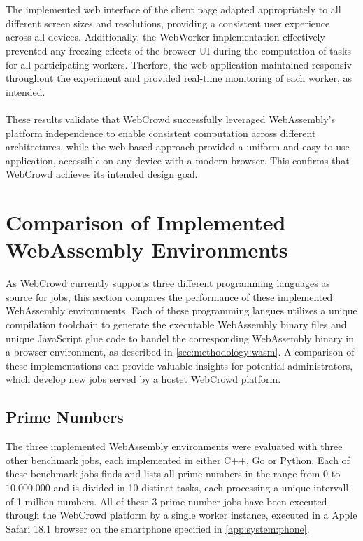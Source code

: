 \\~\\
The implemented web interface of the client page adapted appropriately to all different screen sizes and resolutions, providing a consistent user experience across all devices. Additionally, the WebWorker implementation effectively prevented any freezing effects of the browser \ac{UI} during the computation of tasks for all participating workers. Therfore, the web application maintained responsiv throughout the experiment and provided real-time monitoring of each worker, as intended.
\\~\\
These results validate that WebCrowd successfully leveraged WebAssembly's platform independence to enable consistent computation across different architectures, while the web-based approach provided a uniform and easy-to-use application, accessible on any device with a modern browser. This confirms that WebCrowd achieves its intended design goal.

\section{Comparison of Implemented WebAssembly Environments}
\label{sec:evaluation:languages}
As WebCrowd currently supports three different programming languages as source for jobs, this section compares the performance of these implemented WebAssembly environments. Each of these programming langues utilizes a unique compilation toolchain to generate the executable WebAssembly binary files and unique JavaScript glue code to handel the corresponding WebAssembly binary in a browser environment, as described in \autoref{sec:methodology:wasm}. A comparison of these implementations can provide valuable insights for potential administrators, which develop new jobs served by a hostet WebCrowd platform.

\subsection{Prime Numbers}
The three implemented WebAssembly environments were evaluated with three other benchmark jobs, each implemented in either C++, Go or Python. Each of these benchmark jobs finds and lists all prime numbers in the range from $0$ to $10.000.000$ and is divided in 10 distinct tasks, each processing a unique intervall of 1 million numbers. All of these 3 prime number jobs have been executed through the WebCrowd platform by a single worker instance, executed in a Apple Safari 18.1 \cite{evaluation:safari} browser on the smartphone specified in \autoref{app:system:phone}.

